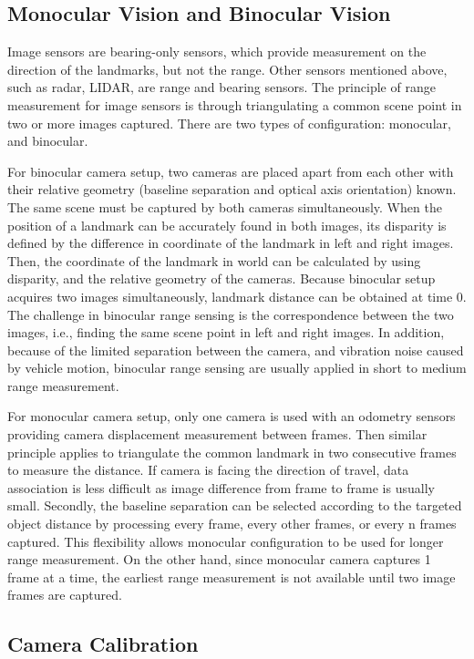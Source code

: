 \subsection{Monocular Vision and Binocular Vision}
Image sensors are bearing-only sensors, which provide measurement on
the direction of the landmarks, but not the range. Other sensors
mentioned above, such as radar, LIDAR, are range and bearing sensors.
The principle of range measurement for image sensors is through
triangulating a common scene point in two or more images captured.
There are two types of configuration: monocular, and binocular.

For binocular camera setup, two cameras are placed apart from each
other with their relative geometry (baseline separation and optical
axis orientation) known. The same scene must be captured by both
cameras simultaneously. When the position of a landmark can be
accurately found in both images, its disparity is defined by the
difference in coordinate of the landmark in left and right images.
Then, the coordinate of the landmark in world can be calculated by
using disparity, and the relative geometry of the cameras. Because
binocular setup acquires two images simultaneously, landmark distance
can be obtained at time $0$. The challenge in binocular range sensing
is the correspondence between the two images, i.e., finding the same
scene point in left and right images. In addition, because of the
limited separation between the camera, and vibration noise caused
by vehicle motion, binocular range sensing are usually applied in
short to medium range measurement.

For monocular camera setup, only one camera is used with an odometry
sensors providing camera displacement measurement between frames. Then
similar principle applies to triangulate the common landmark in two
consecutive frames to measure the distance. If camera is facing the
direction of travel, data association is less difficult as image
difference from frame to frame is usually small. Secondly, the
baseline separation can be selected according to the targeted object
distance by processing every frame, every other frames, or every n
frames captured. This flexibility allows monocular configuration to be
used for longer range measurement. On the other hand, since monocular
camera captures 1 frame at a time, the earliest range measurement is
not available until two image frames are captured.

\subsection{Camera Calibration}

